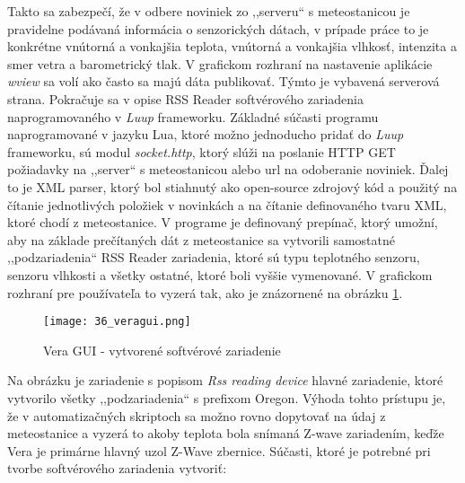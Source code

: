 Takto sa zabezpečí, že v odbere noviniek zo ,,serveru`` s meteostanicou je pravidelne podávaná informácia o senzorických dátach, v prípade práce to je konkrétne vnútorná a vonkajšia teplota, vnútorná a vonkajšia vlhkosť, intenzita a smer vetra a barometrický tlak. V grafickom rozhraní na nastavenie aplikácie \textit{wview} sa volí ako často sa majú dáta publikovať. Týmto je vybavená serverová strana. Pokračuje sa v opise RSS Reader softvérového zariadenia naprogramovaného v \textit{Luup} frameworku. Základné súčasti programu naprogramované v jazyku Lua, ktoré možno jednoducho pridať do \textit{Luup} frameworku, sú  modul \textit{socket.http}, ktorý slúži na poslanie HTTP GET požiadavky na ,,server`` s meteostanicou alebo url na odoberanie noviniek. Ďalej to je XML parser, ktorý bol stiahnutý ako open-source zdrojový kód a použitý na čítanie jednotlivých položiek v novinkách a na čítanie definovaného tvaru XML, ktoré chodí z meteostanice. V programe je definovaný prepínač, ktorý umožní, aby na základe prečítaných dát z meteostanice sa vytvorili samostatné ,,podzariadenia`` RSS Reader zariadenia, ktoré sú typu teplotného senzoru, senzoru vlhkosti a všetky ostatné, ktoré boli vyššie vymenované. V grafickom rozhraní pre používateľa to vyzerá tak, ako je znázornené na obrázku \ref{36_veragui}. 
\begin{figure}[h]
\centering
\texttt{[image: 36\_veragui.png]}
\caption{Vera GUI - vytvorené softvérové zariadenie}
\label{36_veragui}
\end{figure} 
Na obrázku je zariadenie s popisom \textit{Rss reading device} hlavné zariadenie, ktoré vytvorilo všetky ,,podzariadenia`` s prefixom Oregon. Výhoda tohto prístupu je, že v automatizačných skriptoch sa možno rovno dopytovať na údaj z meteostanice a vyzerá to akoby teplota bola snímaná Z-wave zariadením, keďže Vera je primárne hlavný uzol Z-Wave zbernice. Súčasti, ktoré je potrebné pri tvorbe softvérového zariadenia vytvoriť:
